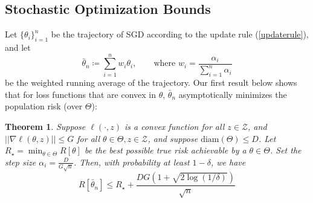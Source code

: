\documentclass{article}[12pt]
\newtheorem{theorem}{Theorem}
\def\Z{\mathcal{Z}}
\newcommand{\norm}[1]{\left|\left|#1\right|\right|}
\begin{document}
\subsection{Stochastic Optimization Bounds}
Let $\{\theta_i\}_{i=1}^n$ be the trajectory of SGD according to the update rule (\ref{updaterule}), and let 
\begin{equation}
   \label{eq:weighted}
\bar{\theta}_n \coloneqq \sum_{i=1}^n w_i \theta_i, \qquad \text{where } w_i = \frac{\alpha_i}{\sum_{i=1}^n \alpha_i}     
\end{equation}
be the weighted running average of the trajectory. Our first result below shows that for loss functions that are convex in $\theta$, $\bar{\theta}_n$ asymptotically minimizes the population risk (over $\Theta$):  
\begin{theorem}
  Suppose $\ell(\cdot, z)$ is a convex function for all $z \in \Z$, and $\norm{\nabla \ell(\theta, z)} \leq G$ for all $\theta \in \Theta, z \in \Z$, and suppose $\text{diam}(\Theta) \leq D$. Let $R_\star = \min_{\theta \in \Theta} R[\theta]$ be the best possible true risk achievable by a $\theta \in \Theta$. Set the step size $\alpha_i = \frac{D}{G\sqrt{n}}$. Then, with probability at least $1 - \delta$, we have 
  \begin{equation}
     \label{excess}
  R[\bar{\theta}_n] \leq R_\star + \frac{DG(1 + \sqrt{2 \log(1/\delta)})}{\sqrt{n}}   
  \end{equation}
\end{theorem}
\end{document}
